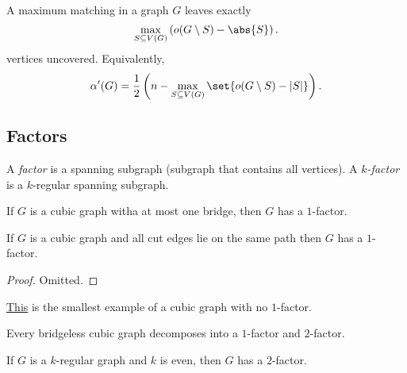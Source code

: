\begin{theorem}
    A maximum matching in a graph $G$ leaves exactly
    \[
    \max_{S \subseteq V(G)} \left(o(G \setminus S) - \abs{S}\right).
    \]
    vertices uncovered. Equivalently,
    \[
    \alpha'(G) = \frac{1}{2}\left(n - \max_{S \subseteq V(G)} \set{o(G \setminus S) - |S|}\right).
    \]
\end{theorem}


\subsection{Factors}


\begin{definition}
    A \emph{factor} is a spanning subgraph (subgraph that contains all vertices).
    A \emph{$k$-factor} is a $k$-regular spanning subgraph.
\end{definition}

\begin{theorem}[Petersen]
    If $G$ is a cubic graph witha at most one bridge, then 
    $G$ has a $1$-factor.    
\end{theorem}


\begin{theorem}[Petersen]
    If $G$ is a cubic graph and all cut edges lie on the 
    same path then $G$ has a $1$-factor.
\end{theorem}

\begin{proof}
    Omitted.
\end{proof}

\begin{example}
    \href{https://mathworld.wolfram.com/PetersensTheorem.html}{This} 
    is the smallest example of a cubic graph with no $1$-factor.
\end{example}

\begin{theorem}[Petersen]
    Every bridgeless cubic graph decomposes into a $1$-factor 
    and $2$-factor.
\end{theorem}

\begin{theorem}
    If $G$ is a $k$-regular graph and $k$ is even, then $G$ has 
    a $2$-factor.
\end{theorem}